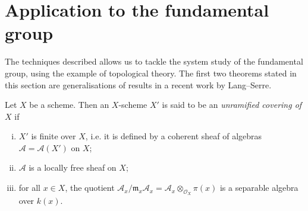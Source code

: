 \section{Application to the fundamental group}\label{fga2-8}

The techniques described allows us to tackle the system study of the fundamental group, using the example of topological theory.
The first two theorems stated in this section are generalisations of results in a recent work by Lang–Serre.

Let $X$ be a scheme.
Then an $X$-scheme $X'$ is said to be an \emph{unramified covering of $X$} if
\begin{enumerate}[i.]
    \item $X'$ is finite over $X$, i.e. it is defined by a coherent sheaf of algebras $\mathcal{A}=\mathcal{A}(X')$ on $X$;
    \item $\mathcal{A}$ is a locally free sheaf on $X$;
    \item for all $x\in X$, the quotient $\mathcal{A}_x/\mathfrak{m}_x\mathcal{A}_x = \mathcal{A}_x\otimes_{\mathcal{O}_X}\pi(x)$ is a separable algebra over $k(x)$.
\end{enumerate}

